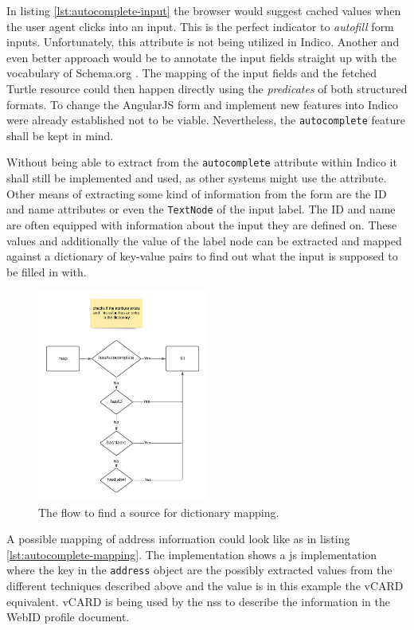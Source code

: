In listing \ref{lst:autocomplete-input} the browser would suggest cached values when the user agent clicks into an input. This is the perfect indicator to \textit{autofill} form inputs. Unfortunately, this attribute is not being utilized in Indico. Another and even better approach would be to annotate the input fields straight up with the vocabulary of Schema.org \cite{schema-org}. The mapping of the input fields and the fetched Turtle resource could then happen directly using the \textit{predicates} of both structured formats. To change the AngularJS form and implement new features into Indico were already established not to be viable. Nevertheless, the \texttt{autocomplete} feature shall be kept in mind.

Without being able to extract from the \texttt{autocomplete} attribute within Indico it shall still be implemented and used, as other systems might use the attribute. Other means of extracting some kind of information from the form are the ID and name attributes or even the \texttt{TextNode} of the input label. The ID and name are often equipped with information about the input they are defined on. These values and additionally the value of the label node can be extracted and mapped against a dictionary of key-value pairs to find out what the input is supposed to be filled in with.

\begin{figure}[H]
    \centering
    \includegraphics[width=0.5\textwidth]{prototype/graphs/poc-autocomplete-mapping-flow.png}
    \caption{The flow to find a source for dictionary mapping.}
    \label{fig:poc-autocomplete-mapping-flow}
\end{figure}

A possible mapping of address information could look like as in listing \ref{lst:autocomplete-mapping}. The implementation shows a \gls{js} implementation where the key in the \texttt{address} object are the possibly extracted values from the different techniques described above and the value is in this example the vCARD \cite{vcard-spec} equivalent. vCARD is being used by the \gls{nss} to describe the information in the WebID profile document.

